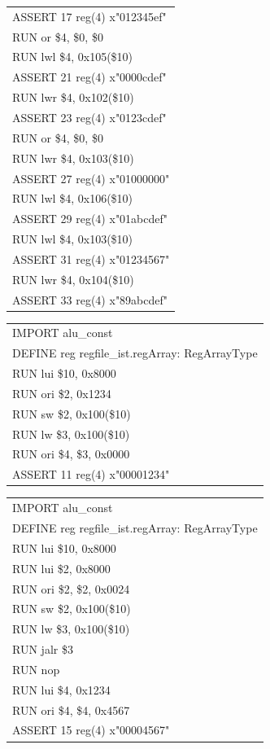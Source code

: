 \documentclass[11pt,utf8]{article}
\begin{document}
{{{{\begin{center}
\begin{longtable}{p{15cm}}
		ASSERT{ }17{ }reg(4){ }x"012345ef"\\
		RUN{ }or{ }{ }\$4,{ }\$0,{ }\$0\\
		RUN{ }lwl{ }\$4,{ }0x105(\$10)\\
		ASSERT{ }21{ }reg(4){ }x"0000cdef"\\
		RUN{ }lwr{ }\$4,{ }0x102(\$10)\\
		ASSERT{ }23{ }reg(4){ }x"0123cdef"\\
		RUN{ }or{ }{ }\$4,{ }\$0,{ }\$0\\
		RUN{ }lwr{ }\$4,{ }0x103(\$10)\\
		ASSERT{ }27{ }reg(4){ }x"01000000"\\
		RUN{ }lwl{ }\$4,{ }0x106(\$10)\\
		ASSERT{ }29{ }reg(4){ }x"01abcdef"\\
		RUN{ }lwl{ }\$4,{ }0x103(\$10)\\
		ASSERT{ }31{ }reg(4){ }x"01234567"\\
		RUN{ }lwr{ }\$4,{ }0x104(\$10)\\
		ASSERT{ }33{ }reg(4){ }x"89abcdef"\\
		\hline \end{longtable} \end{center}
\begin{center}	\begin{longtable}{p{15cm}} \hline
		IMPORT{ }alu\_const\\
		DEFINE{ }reg{ }regfile\_ist.regArray:{ }RegArrayType\\
		RUN{ }lui{ }\$10,{ }0x8000\\
		RUN{ }ori{ }\$2,{ }0x1234\\
		RUN{ }sw{ }\$2,{ }0x100(\$10)\\
		RUN{ }lw{ }\$3,{ }0x100(\$10)\\
		RUN{ }ori{ }\$4,{ }\$3,{ }0x0000\\
		ASSERT{ }11{ }reg(4){ }x"00001234"\\
		\hline \end{longtable} \end{center}
\begin{center}	\begin{longtable}{p{15cm}} \hline
		IMPORT{ }alu\_const\\
		DEFINE{ }reg{ }regfile\_ist.regArray:{ }RegArrayType\\
		RUN{ }lui{ }\$10,{ }0x8000\\
		RUN{ }lui{ }\$2,{ }0x8000\\
		RUN{ }ori{ }\$2,{ }\$2,{ }0x0024\\
		RUN{ }sw{ }\$2,{ }0x100(\$10)\\
		RUN{ }lw{ }\$3,{ }0x100(\$10)\\
		RUN{ }jalr{ }\$3\\
		RUN{ }nop\\
		RUN{ }lui{ }\$4,{ }0x1234\\
		RUN{ }ori{ }\$4,{ }\$4,{ }0x4567\\
		ASSERT{ }15{ }reg(4){ }x"00004567"\\
		\hline \end{longtable} \end{center}
}
}

}}
\end{document}
